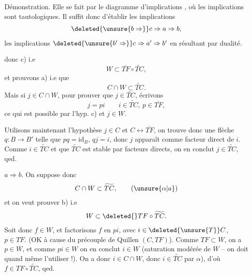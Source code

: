 Démonstration. Elle se fait par le diagramme
d'implications
,
où les  implications   sont
tautologiques. Il suffit donc d'établir les
 implications
\[
\deleted{\unsure{b\Rightarrow}} c\Rightarrow a\Rightarrow b,
\]
les implications $\deleted{\unsure{b'\Rightarrow}}c\Rightarrow a'\Rightarrow b'$ en résultant
par dualité. 

   donc c) i.e
\[
W\subset\overline{TF}\circ\widetilde{TC},
\]
et prouvons a) i.e que
\[
C\cap W\subset\widetilde{TC}.
\]
Mais si $j\in C\cap W$, pour prouver que $j\in\widetilde{TC}$, écrivons
\[
j=pi\qquad i\in\widetilde{TC},\ p\in\overline{TF},
\]
ce qui est possible par l'hyp. c) et $j\in W$.


Utilisons maintenant l'hypothèse $j\in C$ et $C\longleftrightarrow\overline{TF}$,
on trouve donc  une flèche $q:B\to B'$ telle
que $pq=\mathrm{id}_B$, $qj=i$, donc $j$ apparaît comme
facteur direct de $i$. Comme $i\in\widetilde{TC}$ et que
$\widetilde{TC}$ est stable par facteurs directs, on en
conclut $j\in\widetilde{TC}$, qed.

$a\Rightarrow b$. On suppose donc
\[
C\cap W\subset\widetilde{TC},
\tag*{($\unsure{\alpha|a}$)}
\]
et on veut prouver b) i.e
\[
W\subset\deleted{\overline{\vphantom{TF}}}TF\circ\widetilde{TC}.
\]
Soit donc $f\in W$, et factorisons $f$ en $pi$, avec
$i\in\deleted{\unsure{T}}C$, $p\in TF$. (OK à cause du précouple de Quillen
$(C,TF)$). Comme $TF\subset W$, on a $p\in W$, et comme
$pi\in W$ on en conclut $i\in W$ (saturation
modérée de $W$ -- on doit quand même
l'utiliser !). On a donc $i\in C\cap W$, donc
$i\in\widetilde{TC}$ par $\alpha$), d'où $f\in TF\circ\widetilde{TC}$, qed.

